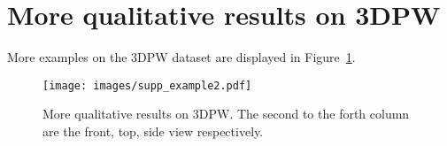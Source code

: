 \documentclass[runningheads]{llncs}
\begin{document}
\section{More qualitative results on 3DPW}

More examples on the 3DPW dataset are displayed in Figure~\ref{fig:3dpw}.

\begin{figure}[t!]
  \centering
  {\texttt{[image: images/supp\_example2.pdf]}}
  \vspace{9pt}
\caption{More qualitative results on 3DPW. The second to the forth column are the front, top, side view respectively.} 
\label{fig:3dpw}
\end{figure}
\end{document}
